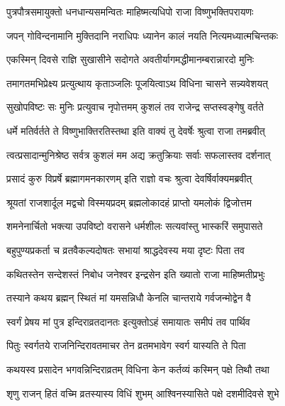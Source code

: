 \twolineshloka
{पुत्रपौत्रसमायुक्तो धनधान्यसमन्वितः}
{माहिष्मत्यधिपो राजा विष्णुभक्तिपरायणः} %

\twolineshloka
{जपन् गोविन्दनामानि मुक्तिदानि नराधिपः}
{ध्यानेन कालं नयति नित्यमध्यात्मचिन्तकः} %

\twolineshloka
{एकस्मिन् दिवसे राज्ञि सुखासीने सदोगते}
{अवतीर्यागमद्धीमानम्बरान्नारदो मुनिः} %

\twolineshloka
{तमागतमभिप्रेक्ष्य प्रत्युत्थाय कृताञ्जलिः}
{पूजयित्वाऽथ विधिना चासने सन्न्यवेशयत्} %

\twolineshloka
{सुखोपविष्टः सः मुनिः प्रत्युवाच नृपोत्तमम्}
{कुशलं तव राजेन्द्र सप्तस्वङ्गेषु वर्तते} %

\twolineshloka
{धर्मे मतिर्वर्तते ते विष्णुभाक्तिरतिस्तथा}
{इति वाक्यं तु देवर्षेः श्रुत्वा राजा तमब्रवीत्} %


\twolineshloka
{त्वत्प्रसादान्मुनिश्रेष्ठ सर्वत्र कुशलं मम}
{अद्य क्रतुक्रियाः सर्वाः सफलास्तव दर्शनात्} %

\twolineshloka
{प्रसादं कुरु विप्रर्षे ब्रह्मागमनकारणम्}
{इति राज्ञो वचः श्रुत्वा देवर्षिर्वाक्यमब्रवीत्} %


\twolineshloka
{श्रूयतां राजशार्दूल मद्वचो विस्मयप्रदम्}
{ब्रह्मलोकादहं प्राप्तो यमलोकं द्विजोत्तम} %

\twolineshloka
{शमनेनार्चितो भक्त्या उपविष्टो वरासने}
{धर्मशीलः सत्यवांस्तु भास्करिं समुपासते} %

\twolineshloka
{बहुपुण्यप्रकर्ता च व्रतवैकल्यदोषतः}
{सभायां श्राद्धदेवस्य मया दृष्टः पिता तव} %

\twolineshloka
{कथितस्तेन सन्देशस्तं निबोध जनेश्वर}
{इन्द्रसेन इति ख्यातो राजा माहिष्मतीप्रभुः} %

\twolineshloka
{तस्याने कथय ब्रह्मन् स्थितं मां यमसन्निधौ}
{केनलि चान्तराये गर्वजन्मोद्वेन वै} %

\twolineshloka
{स्वर्गं प्रेषय मां पुत्र इन्दिराव्रतदानतः}
{इत्युक्तोऽहं समायातः समीपं तव पार्थिव} %

\twolineshloka
{पितुः स्वर्गतये राजनिन्दिरावतमाचर}
{तेन व्रतमभावेग स्वर्ग यास्यति ते पिता} %


\twolineshloka
{कथयस्व प्रसादेन भगवन्निन्दिराव्रतम्}
{विधिना केन कर्तव्यं कस्मिन् पक्षे तिथौ तथा} %


\twolineshloka
{शृणु राजन् हितं वच्मि व्रतस्यास्य विधिं शुभम्}
{आश्विनस्यासिते पक्षे दशमीदिवसे शुभे} %

